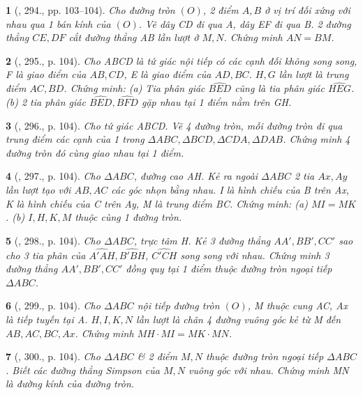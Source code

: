 \documentclass{article}
\newtheorem{baitoan}{}
\begin{document}
\begin{baitoan}[\cite{Binh_Toan_9_tap_2}, 294., pp. 103--104]
	Cho đường tròn $(O)$, 2 điểm $A,B$ ở vị trí đối xứng với nhau qua 1 bán kính của $(O)$. Vẽ dây CD đi qua A, dây EF đi qua B. 2 đường thẳng $CE,DF$ cắt đường thẳng AB lần lượt ở $M,N$. Chứng minh $AN = BM$.
\end{baitoan}

\begin{baitoan}[\cite{Binh_Toan_9_tap_2}, 295., p. 104]
	Cho ABCD là tứ giác nội tiếp có các cạnh đối không song song, F là giao điểm của $AB,CD$, E là giao điểm của $AD,BC$. $H,G$ lần lượt là trung điểm $AC,BD$. Chứng minh: (a) Tia phân giác $\widehat{BED}$ cũng là tia phân giác $\widehat{HEG}$. (b) 2 tia phân giác $\widehat{BED},\widehat{BFD}$ gặp nhau tại 1 điểm nằm trên GH.
\end{baitoan}

\begin{baitoan}[\cite{Binh_Toan_9_tap_2}, 296., p. 104]
	Cho tứ giác ABCD. Vẽ 4 đường tròn, mỗi đường tròn đi qua trung điểm các cạnh của 1 trong $\Delta ABC,\Delta BCD,\Delta CDA,\Delta DAB$. Chứng minh 4 đường tròn đó cùng giao nhau tại 1 điểm.
\end{baitoan}

\begin{baitoan}[\cite{Binh_Toan_9_tap_2}, 297., p. 104]
	Cho $\Delta ABC$, đường cao AH. Kẻ ra ngoài $\Delta ABC$ 2 tia $Ax,Ay$ lần lượt tạo với $AB,AC$ các góc nhọn bằng nhau. I là hình chiếu của B trên Ax, K là hình chiếu của C trên Ay, M là trung điểm BC. Chứng minh: (a) $MI = MK$. (b) $I,H,K,M$ thuộc cùng 1 đường tròn.
\end{baitoan}

\begin{baitoan}[\cite{Binh_Toan_9_tap_2}, 298., p. 104]
	Cho $\Delta ABC$, trực tâm H. Kẻ 3 đường thẳng $AA',BB',CC'$ sao cho 3 tia phân của $\widehat{A'AH},\widehat{B'BH}$, $\widehat{C'CH}$ song song với nhau. Chứng minh 3 đường thẳng $AA',BB',CC'$ đồng quy tại 1 điểm thuộc đường tròn ngoại tiếp $\Delta ABC$.
\end{baitoan}

\begin{baitoan}[\cite{Binh_Toan_9_tap_2}, 299., p. 104]
	Cho $\Delta ABC$ nội tiếp đường tròn $(O)$, M thuộc cung AC, Ax là tiếp tuyến tại A. $H,I,K,N$ lần lượt là chân 4 đường vuông góc kẻ từ M đến $AB,AC,BC,Ax$. Chứng minh $MH\cdot MI = MK\cdot MN$.
\end{baitoan}

\begin{baitoan}[\cite{Binh_Toan_9_tap_2}, 300., p. 104]
	Cho $\Delta ABC$ \& 2 điểm $M,N$ thuộc đường tròn ngoại tiếp $\Delta ABC$. Biết các đường thẳng Simpson của $M,N$ vuông góc với nhau. Chứng minh MN là đường kính của đường tròn.
\end{baitoan}
\end{document}
